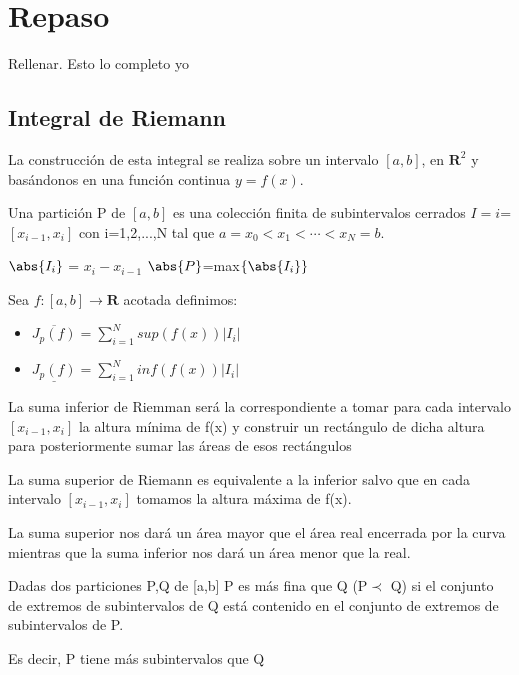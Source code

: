 \documentclass{apuntes}
\begin{document}
\chapter{Repaso}
\begin{theorem}
Rellenar. Esto lo completo yo
\end{theorem}

\section{Integral de Riemann}
La construcción de esta integral se realiza sobre un intervalo $[a,b]$, en $\textbf{R}^2$ y basándonos en una función continua $y=f(x)$.
\begin{defn}[Partición]
Una partición P de $[a,b]$ es una colección finita de subintervalos cerrados $I=i$=$[x_{i-1}, x_i]$ con i=1,2,...,N tal que $a=x_0<x_1<\cdots < x_N=b$.

$\abs{I_i}$ = $x_i-x_{i-1}$
$\abs{P}$=max$\lbrace \abs{I_i} \rbrace$
\end{defn}

Sea $f:[ a,b ] \rightarrow \textbf{R}$ acotada definimos:
\begin{itemize}
\item \begin{defn}
$\overline{J_p(f)}=\sum_{i=1}^{N}sup(f(x))|I_i|$
\end{defn}

\item \begin{defn}
$\underline{J_p(f)}=\sum_{i=1}^{N}inf(f(x))|I_i|$
\end{defn}
\end{itemize}

La suma inferior de Riemman será la correspondiente a tomar para cada intervalo $[x_{i-1}, x_i]$ la altura mínima de f(x) y construir un rectángulo de dicha altura para posteriormente sumar las áreas de esos rectángulos

La suma superior de Riemann es equivalente a la inferior salvo que en cada intervalo $[x_{i-1}, x_i]$ tomamos la altura máxima de f(x).

La suma superior nos dará un área mayor que el área real encerrada por la curva mientras que la suma inferior nos dará un área menor que la real.

\newpage
\begin{defn}[Finura]
Dadas dos particiones P,Q de [a,b] P es más fina que Q (P$\prec$ Q) si el conjunto de extremos de subintervalos de Q está contenido en el conjunto de extremos de subintervalos de P.

Es decir, P tiene más subintervalos que Q
\end{defn}
\end{document}
